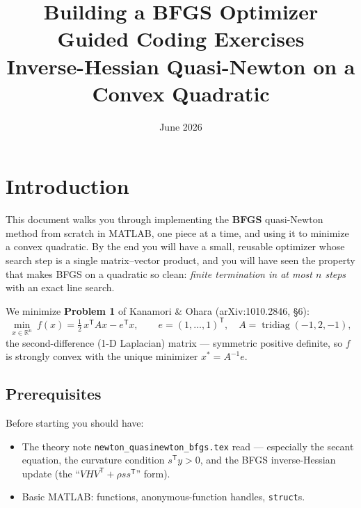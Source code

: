 \documentclass[11pt,letterpaper]{article}
\title{\textbf{Building a BFGS Optimizer}\\[8pt]
\large Guided Coding Exercises\\[4pt]
\normalsize Inverse-Hessian Quasi-Newton on a Convex Quadratic}
\author{}
\date{June 2026}
\newcommand{\R}{\mathbb{R}}
\newcommand{\T}{^{\mathsf{T}}}
\newcommand{\half}{\tfrac12}
\begin{document}
\maketitle
\thispagestyle{fancy}

\tableofcontents
\newpage

\section{Introduction}

This document walks you through implementing the \textbf{BFGS} quasi-Newton method
from scratch in MATLAB, one piece at a time, and using it to minimize a convex
quadratic. By the end you will have a small, reusable optimizer whose search step is
a single matrix--vector product, and you will have seen the property that makes BFGS
on a quadratic so clean: \emph{finite termination in at most $n$ steps} with an exact
line search.

We minimize \textbf{Problem 1} of Kanamori \& Ohara (arXiv:1010.2846, \S6):
\begin{equation}\label{eq:prob1}
\min_{x\in\R^n}\ f(x)=\half\,x\T A x - e\T x,
\qquad e=(1,\dots,1)\T,\quad
A=\operatorname{tridiag}(-1,2,-1),
\end{equation}
the second-difference (1-D Laplacian) matrix --- symmetric positive definite, so $f$
is strongly convex with the unique minimizer $x^\ast=A^{-1}e$.

\subsection{Prerequisites}
Before starting you should have:
\begin{itemize}[nosep]
  \item The theory note \texttt{newton\_quasinewton\_bfgs.tex} read --- especially the
    secant equation, the curvature condition $s\T y>0$, and the BFGS inverse-Hessian
    update (the ``$V H V\T+\rho ss\T$'' form).
  \item Basic MATLAB: functions, anonymous-function handles, \texttt{struct}s.
\end{itemize}
\end{document}

